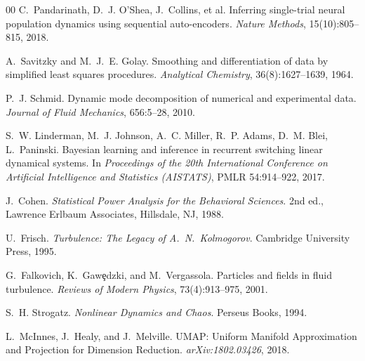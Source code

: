 \documentclass[5p,twocolumn,authoryear]{elsarticle}
\begin{document}
\begin{thebibliography}{00}
C.~Pandarinath, D.~J. O'Shea, J.~Collins, et al.
\newblock Inferring single-trial neural population dynamics using sequential auto-encoders.
\newblock \emph{Nature Methods}, 15(10):805--815, 2018.

A.~Savitzky and M.~J.~E. Golay.
\newblock Smoothing and differentiation of data by simplified least squares procedures.
\newblock \emph{Analytical Chemistry}, 36(8):1627--1639, 1964.

P.~J. Schmid.
\newblock Dynamic mode decomposition of numerical and experimental data.
\newblock \emph{Journal of Fluid Mechanics}, 656:5--28, 2010.

S.~W. Linderman, M.~J. Johnson, A.~C. Miller, R.~P. Adams, D.~M. Blei, L.~Paninski.
\newblock Bayesian learning and inference in recurrent switching linear dynamical systems.
\newblock In \emph{Proceedings of the 20th International Conference on Artificial Intelligence and Statistics (AISTATS)}, PMLR 54:914--922, 2017.

J.~Cohen.
\newblock \emph{Statistical Power Analysis for the Behavioral Sciences}.
\newblock 2nd ed., Lawrence Erlbaum Associates, Hillsdale, NJ, 1988.

U.~Frisch.
\newblock \emph{Turbulence: The Legacy of A.~N.~Kolmogorov}.
\newblock Cambridge University Press, 1995.

G.~Falkovich, K.~Gaw\c{e}dzki, and M.~Vergassola.
\newblock Particles and fields in fluid turbulence.
\newblock \emph{Reviews of Modern Physics}, 73(4):913--975, 2001.

S.~H. Strogatz.
\newblock \emph{Nonlinear Dynamics and Chaos}.
\newblock Perseus Books, 1994.

L.~McInnes, J.~Healy, and J.~Melville.
\newblock UMAP: Uniform Manifold Approximation and Projection for Dimension Reduction.
\newblock \emph{arXiv:1802.03426}, 2018.

\end{thebibliography}
\end{document}
